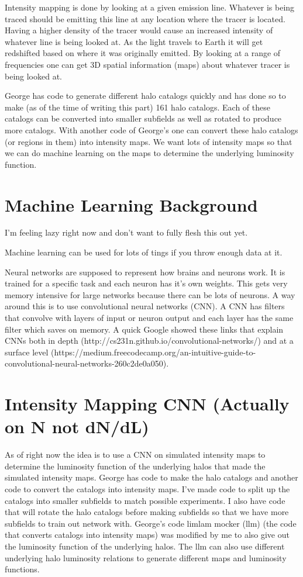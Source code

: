 \documentclass{article}
\begin{document}
		Intensity mapping is done by looking at a given emission line.  Whatever is being traced should be emitting this line at any location where the tracer is located.  Having a higher density of the tracer would cause an increased intensity of whatever line is being looked at.  As the light travels to Earth it will get redshifted based on where it was originally emitted.  By looking at a range of frequencies one can get 3D spatial information (maps) about whatever tracer is being looked at.  

		George has code to generate different halo catalogs quickly and has done so to make (as of the time of writing this part) 161 halo catalogs.  Each of these catalogs can be converted into smaller subfields as well as rotated to produce more catalogs.  With another code of George's one can convert these halo catalogs (or regions in them) into intensity maps.  We want lots of intensity maps so that we can do machine learning on the maps to determine the underlying luminosity function.

	\section{Machine Learning Background} \label{sec:MLback}

		I'm feeling lazy right now and don't want to fully flesh this out yet.

		Machine learning can be used for lots of tings if you throw enough data at it.  

		Neural networks are supposed to represent how brains and neurons work.  It is trained for a specific task and each neuron has it's own weights.  This gets very memory intensive for large networks because there can be lots of neurons.  A way around this is to use convolutional neural networks (CNN).  A CNN has filters that convolve with layers of input or neuron output and each layer has the same filter which saves on memory.  A quick Google showed these links that explain CNNs both in depth (http://cs231n.github.io/convolutional-networks/) and at a surface level (https://medium.freecodecamp.org/an-intuitive-guide-to-convolutional-neural-networks-260c2de0a050).

	\section{Intensity Mapping CNN (Actually on N not dN/dL)} \label{sec:cnn}

		As of right now the idea is to use a CNN on simulated intensity maps to determine the luminosity function of the underlying halos that made the simulated intensity maps.  George has code to make the halo catalogs and another code to convert the catalogs into intensity maps.  I've made code to split up the catalogs into smaller subfields to match possible experiments.  I also have code that will rotate the halo catalogs before making subfields so that we have more subfields to train out network with.  George's code limlam mocker (llm) (the code that converts catalogs into intensity maps) was modified by me to also give out the luminosity function of the underlying halos.  The llm can also use different underlying halo luminosity relations to generate different maps and luminosity functions.
\end{document}
